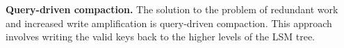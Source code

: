 \textbf{Query-driven compaction.} The solution to the problem of redundant work and increased write amplification is
query-driven compaction. This approach involves writing the valid keys back to the higher levels of the LSM tree.